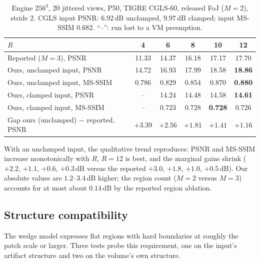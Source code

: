 \documentclass[11pt]{article}
\newcommand{\dB}{\,\mathrm{dB}}
\begin{document}
\begin{table}[t]
\centering
\caption{Engine $256^3$, 20 jittered views, P50, TIGRE CGLS-60, released
FoJ ($M{=}2$), stride 2. CGLS input PSNR: $6.92\dB$ unclamped, $9.97\dB$
clamped; input MS-SSIM 0.682. ``--'': run lost to a VM preemption.}
\label{tab:tigre}
\begin{tabular}{lccccc}
\toprule
$R$ & 4 & 6 & 8 & 10 & 12 \\
\midrule
Reported ($M{=}3$), PSNR            & 11.33 & 14.37 & 16.18 & 17.17 & 17.70 \\
\midrule
Ours, unclamped input, PSNR         & 14.72 & 16.93 & 17.99 & 18.58 & \textbf{18.86} \\
Ours, unclamped input, MS-SSIM      & 0.786 & 0.829 & 0.854 & 0.870 & \textbf{0.880} \\
\midrule
Ours, clamped input, PSNR           & --    & 14.24 & 14.48 & 14.58 & \textbf{14.61} \\
Ours, clamped input, MS-SSIM        & --    & 0.723 & 0.728 & \textbf{0.728} & 0.726 \\
\midrule
Gap ours (unclamped) $-$ reported, PSNR & $+3.39$ & $+2.56$ & $+1.81$ & $+1.41$ & $+1.16$ \\
\bottomrule
\end{tabular}
\end{table}

With an unclamped input, the qualitative trend reproduces: PSNR and
MS-SSIM increase monotonically with $R$, $R{=}12$ is best, and the
marginal gains shrink ($+2.2$, $+1.1$, $+0.6$, $+0.3\dB$ versus the
reported $+3.0$, $+1.8$, $+1.0$, $+0.5\dB$). Our absolute values are
$1.2$--$3.4\dB$ higher; the region count ($M{=}2$ versus $M{=}3$)
accounts for at most about $0.14\dB$ by the reported region ablation.

\subsection{Structure compatibility}
\label{sec:structure}

The wedge model expresses flat regions with hard boundaries at roughly
the patch scale or larger. Three tests probe this requirement, one on the
input's artifact structure and two on the volume's own structure.
\end{document}
